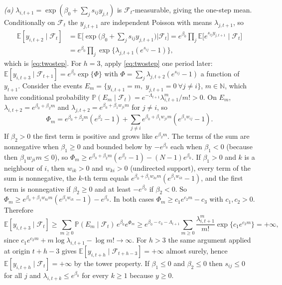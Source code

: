 \documentclass[12pt]{article}
\theoremstyle{plain}
\theoremstyle{definition}
\theoremstyle{remark}
\newcommand{\E}{\mathbb{E}}
\newcommand{\Prob}{\mathbb{P}}
\newcommand{\calF}{\mathcal{F}}
\begin{document}
\emph{(a)} $\lambda_{i,t+1}=\exp(\beta_0+\sum_js_{ij}y_{j,t})$ is $\calF_t$-measurable, giving the one-step mean. Conditionally on $\calF_t$ the $y_{j,t+1}$ are independent Poisson with means $\lambda_{j,t+1}$, so
\begin{align*}
\E[y_{i,t+2}\mid\calF_t]&=\E\Big[\exp\Big(\beta_0+\sum_js_{ij}y_{j,t+1}\Big)\Big|\calF_t\Big]=e^{\beta_0}\prod_j\E\big[e^{s_{ij}y_{j,t+1}}\mid\calF_t\big]\\
&=e^{\beta_0}\prod_j\exp\{\lambda_{j,t+1}(e^{s_{ij}}-1)\},
\end{align*}
which is \eqref{eq:twostep}. For $h=3$, apply \eqref{eq:twostep} one period later: $\E[y_{i,t+3}\mid\calF_{t+1}]=e^{\beta_0}\exp\{\Phi\}$ with $\Phi=\sum_j\lambda_{j,t+2}(e^{s_{ij}}-1)$ a function of $y_{t+1}$. Consider the events $E_m=\{y_{i,t+1}=m,\;y_{j,t+1}=0\ \forall j\ne i\}$, $m\in\mathbb N$, which have conditional probability $\Prob(E_m\mid\calF_t)=e^{-\Lambda_{t+1}}\lambda_{i,t+1}^m/m!>0$. On $E_m$, $\lambda_{i,t+2}=e^{\beta_0+\beta_2m}$ and $\lambda_{j,t+2}=e^{\beta_0+\beta_1w_{ji}m}$ for $j\ne i$, so
\[
\Phi_m=e^{\beta_0+\beta_2m}(e^{\beta_2}-1)+\sum_{j\ne i}e^{\beta_0+\beta_1w_{ji}m}(e^{\beta_1w_{ij}}-1).
\]
If $\beta_2>0$ the first term is positive and grows like $e^{\beta_2m}$. The terms of the sum are nonnegative when $\beta_1\ge0$ and bounded below by $-e^{\beta_0}$ each when $\beta_1<0$ (because then $\beta_1w_{ji}m\le0$), so $\Phi_m\ge e^{\beta_0+\beta_2m}(e^{\beta_2}-1)-(N-1)e^{\beta_0}$. If $\beta_1>0$ and $k$ is a neighbour of $i$, then $w_{ik}>0$ and $w_{ki}>0$ (undirected support), every term of the sum is nonnegative, the $k$-th term equals $e^{\beta_0+\beta_1w_{ki}m}(e^{\beta_1w_{ik}}-1)$, and the first term is nonnegative if $\beta_2\ge0$ and at least $-e^{\beta_0}$ if $\beta_2<0$. So $\Phi_m\ge e^{\beta_0+\beta_1w_{ki}m}(e^{\beta_1w_{ik}}-1)-e^{\beta_0}$. In both cases $\Phi_m\ge c_1e^{c_2m}-c_3$ with $c_1,c_2>0$. Therefore
\[
\E[y_{i,t+3}\mid\calF_t]\ge\sum_{m\ge0}\Prob(E_m\mid\calF_t)\,e^{\beta_0}e^{\Phi_m}\ge e^{\beta_0-c_3-\Lambda_{t+1}}\sum_{m\ge0}\frac{\lambda_{i,t+1}^m}{m!}\exp\{c_1e^{c_2m}\}=+\infty ,
\]
since $c_1e^{c_2m}+m\log\lambda_{i,t+1}-\log m!\to\infty$. For $h>3$ the same argument applied at origin $t+h-3$ gives $\E[y_{i,t+h}\mid\calF_{t+h-3}]=+\infty$ almost surely, hence $\E[y_{i,t+h}\mid\calF_t]=+\infty$ by the tower property. If $\beta_1\le0$ and $\beta_2\le0$ then $s_{ij}\le0$ for all $j$ and $\lambda_{i,t+k}\le e^{\beta_0}$ for every $k\ge1$ because $y\ge0$.
\end{document}

